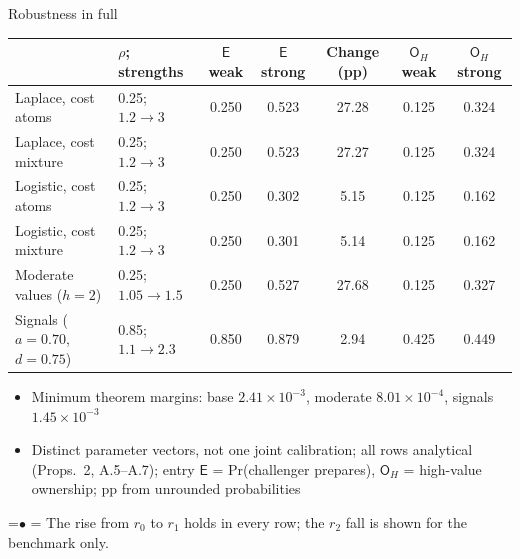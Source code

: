 \documentclass[10pt,aspectratio=169]{beamer}
\newcommand{\TakeawayBody}[1]{\begin{minipage}{\textwidth}\raggedright\normalsize
    \setbox0=\hbox{{\usebeamercolor[fg]{structure}\raise0.7pt\hbox{\scriptsize$\bullet$}}\hspace{0.55em}}%
    \hangindent=\wd0 \hangafter=1 \noindent\box0 #1\par
  \end{minipage}}
\renewcommand{\Takeaway}[2][\ExhibitReadingGap]{\par\vspace{#1}\noindent\TakeawayBody{#2}\par}
\newcommand{\NavGap}{\par\vspace{0.45cm}}%
\let\AdapterBackButton\BackButton
\renewcommand{\BackButton}[1]{\NavGap\AdapterBackButton{#1}}%
\begin{document}
\begin{frame}[label=A26]{Robustness in full}
\hypertarget{app:robust}{}
\vspace{4pt}
\begin{center}\footnotesize
\setlength{\tabcolsep}{4.5pt}
\begin{tabular}{@{}llccccc@{}}
\toprule
 & $\rho$; strengths & $\mathsf E$ weak & $\mathsf E$ strong & Change (pp) & $\mathsf O_H$ weak & $\mathsf O_H$ strong\\
\midrule
Laplace, cost atoms & 0.25; $1.2\to3$ & 0.250 & 0.523 & 27.28 & 0.125 & 0.324\\ %
Laplace, cost mixture & 0.25; $1.2\to3$ & 0.250 & 0.523 & 27.27 & 0.125 & 0.324\\ %
Logistic, cost atoms & 0.25; $1.2\to3$ & 0.250 & 0.302 & 5.15 & 0.125 & 0.162\\ %
Logistic, cost mixture & 0.25; $1.2\to3$ & 0.250 & 0.301 & 5.14 & 0.125 & 0.162\\ %
Moderate values ($h=2$) & 0.25; $1.05\to1.5$ & 0.250 & 0.527 & 27.68 & 0.125 & 0.327\\ %
Signals ($a=0.70$, $d=0.75$) & 0.85; $1.1\to2.3$ & 0.850 & 0.879 & 2.94 & 0.425 & 0.449\\ %
\bottomrule
\end{tabular}
\end{center}
\vspace{-4pt}
{\small
\begin{itemize}\setlength{\itemsep}{2pt}
\item Minimum theorem margins: base $2.41\times10^{-3}$, %
moderate $8.01\times10^{-4}$, %
signals $1.45\times10^{-3}$ %
\item Distinct parameter vectors, not one joint calibration; all rows analytical (Props.~2, A.5--A.7); entry $\mathsf E$ = Pr(challenger prepares), $\mathsf O_H$ = high-value ownership; pp from unrounded probabilities
\end{itemize}}
\Takeaway{The rise from $r_0$ to $r_1$ holds in every row; the $r_2$ fall is shown for the benchmark only.}
\end{frame}
\end{document}
